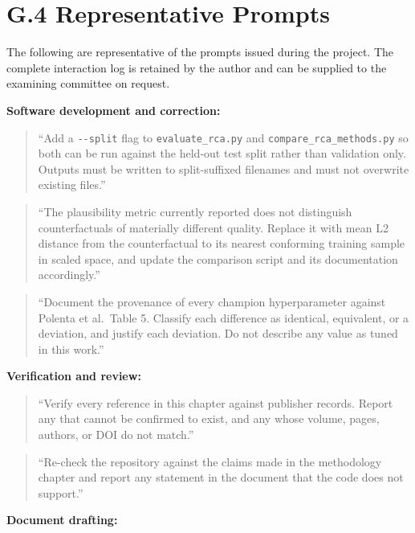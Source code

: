 \hypertarget{g.4-representative-prompts}{%
\section{G.4 Representative Prompts}\label{g.4-representative-prompts}}

The following are representative of the prompts issued during the project. The complete interaction log is retained by the author and can be supplied to the examining committee on request.

\textbf{Software development and correction:}

\begin{quote}
``Add a \texttt{-\/-split} flag to \texttt{evaluate\_rca.py} and \texttt{compare\_rca\_methods.py} so both can be run against the held-out test split rather than validation only. Outputs must be written to split-suffixed filenames and must not overwrite existing files.''
\end{quote}

\begin{quote}
``The plausibility metric currently reported does not distinguish counterfactuals of materially different quality. Replace it with mean L2 distance from the counterfactual to its nearest conforming training sample in scaled space, and update the comparison script and its documentation accordingly.''
\end{quote}

\begin{quote}
``Document the provenance of every champion hyperparameter against Polenta et al.~Table 5. Classify each difference as identical, equivalent, or a deviation, and justify each deviation. Do not describe any value as tuned in this work.''
\end{quote}

\textbf{Verification and review:}

\begin{quote}
``Verify every reference in this chapter against publisher records. Report any that cannot be confirmed to exist, and any whose volume, pages, authors, or DOI do not match.''
\end{quote}

\begin{quote}
``Re-check the repository against the claims made in the methodology chapter and report any statement in the document that the code does not support.''
\end{quote}

\textbf{Document drafting:}

